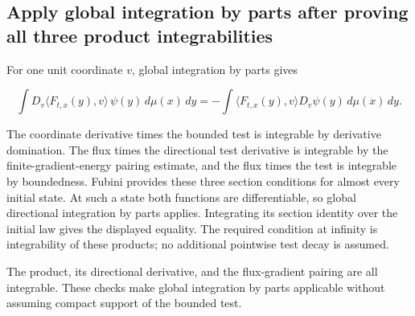 \documentclass[11pt,a4paper]{report}
\begin{document}
\subsection{\texorpdfstring{Apply global integration by parts after proving all three product integrabilities}{Apply global integration by parts after proving all three product integrabilities}}
\label{report-step-UnadjustedLangevin-LSI-GaussianWeakEquation-lean-11}


For one unit coordinate \(v\), global integration by parts gives

\[\int D_v\langle F_{t,x}(y),v\rangle\,\psi(y)\,d\mu(x)\,dy=-\int\langle F_{t,x}(y),v\rangle D_v\psi(y)\,d\mu(x)\,dy.\]

The coordinate derivative times the bounded test is integrable by derivative domination. The flux times the directional test derivative is integrable by the finite-gradient-energy pairing estimate, and the flux times the test is integrable by boundedness. Fubini provides these three section conditions for almost every initial state. At such a state both functions are differentiable, so global directional integration by parts applies. Integrating its section identity over the initial law gives the displayed equality. The required condition at infinity is integrability of these products; no additional pointwise test decay is assumed.



The product, its directional derivative, and the flux-gradient pairing are all integrable. These checks make global integration by parts applicable without assuming compact support of the bounded test.
\end{document}
